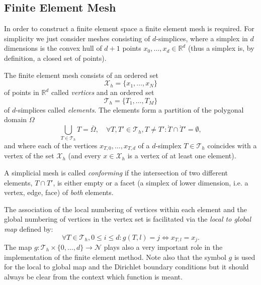\documentclass[a4paper,
		     11pt,
		     DIV12,
		     DIVcalc,
		     headings=normal,
		     oneside,
		     bibliography=totoc,
		     headsepline=false,
		     headinclude]{scrartcl}
\begin{document}
\subsection{Finite Element Mesh}

In order to construct a finite element space a finite element mesh is required.
For simplicity we just consider meshes consisting of $d$-simplices, where a simplex
in $d$ dimensions is the convex hull of $d+1$ points $x_{0},\ldots,x_{d}\in\mathbb{R}^d$
(thus a simplex is, by definition, a closed set of points).

The finite element mesh consists of an ordered set
\begin{equation}
\mathcal{X}_h = \{x_1,\ldots,x_N\}
\end{equation}
of points in $\mathbb{R}^d$ called {\em vertices} and an ordered set 
\begin{equation}
\mathcal{T}_h = \{T_1, \ldots, T_M\}
\end{equation}
of $d$-simplices called {\em elements}.
The elements form a partition of the polygonal domain $\Omega$
\begin{equation}
\bigcup_{T\in \mathcal{T}_h} T = \bar\Omega, \quad 
\forall T, T' \in \mathcal{T}_h, T\neq T' : \mathring{T} \cap \mathring{T}' = \emptyset,
\end{equation}
and where each of the vertices $x_{T,0},\ldots,x_{T,d}$  of a $d$-simplex $T\in\mathcal{T}_h$
coincides with a vertex of the set $\mathcal{X}_h$ (and every $x\in\mathcal{X}_h$ is a vertex
of at least one element).

A simplicial mesh is called {\em conforming} if
the intersection of two different elements, $T\cap T'$, is either
empty or a facet (a simplex of lower dimension, i.e. a vertex, edge, face) of {\em both} elements.

The association of the local numbering of vertices within each element 
and the global numbering of vertices in the vertex set is facilitated
via the {\em local to global map} defined by:
\begin{equation}
\forall T\in\mathcal{T}_h, 0\leq i \leq d: g(T,l) = j \Leftrightarrow x_{T,l} = x_{j} .
\end{equation}
The map $g:\mathcal{T}_h\times\{0,\ldots,d\}\to\mathcal{N}$ 
plays also a very important role in the implementation of the finite element method.
Note also that the symbol $g$ is used for the local to global map and the Dirichlet
boundary conditions but it should always be clear from the context which function is meant.
\end{document}
